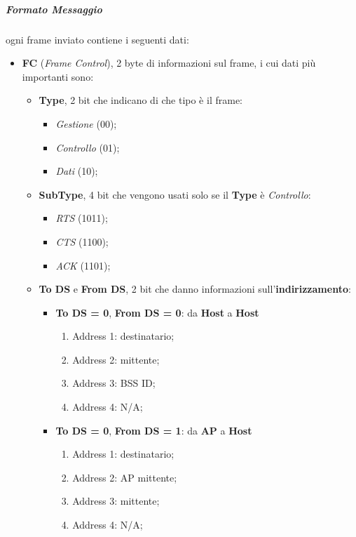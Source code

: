 \documentclass[a4paper]{article}
\begin{document}
			\subparagraph{Formato Messaggio}
				ogni frame inviato contiene i seguenti dati:
				\begin{itemize}
					\item \textbf{FC} (\emph{Frame Control}), 2 byte di informazioni sul frame, i cui dati più importanti sono:
					\begin{itemize}
						\item \textbf{Type}, 2 bit che indicano di che tipo è il frame:
						\begin{itemize}
							\item \emph{Gestione} (00);
							\item \emph{Controllo} (01);
							\item \emph{Dati} (10);
						\end{itemize}
						\item \textbf{SubType}, 4 bit che vengono usati solo se il \textbf{Type} è \emph{Controllo}:
						\begin{itemize}
							\item \emph{RTS} (1011);
							\item \emph{CTS} (1100);
							\item \emph{ACK} (1101);
						\end{itemize}
						\item \textbf{To DS} e \textbf{From DS}, 2 bit che danno informazioni sull'\textbf{indirizzamento}:
						\begin{itemize}
							\item \textbf{To DS = 0}, \textbf{From DS = 0}: da \textbf{Host} a \textbf{Host}
							\begin{enumerate}
								\item Address 1: destinatario;
								\item Address 2: mittente;
								\item Address 3: BSS ID;
								\item Address 4: N/A;
							\end{enumerate}								 
							\item \textbf{To DS = 0}, \textbf{From DS = 1}: da \textbf{AP} a \textbf{Host}
							\begin{enumerate}
								\item Address 1: destinatario;
								\item Address 2: AP mittente;
								\item Address 3: mittente;
								\item Address 4: N/A;
							\end{enumerate}			

\end{itemize}
\end{itemize}
\end{itemize}
\end{document}
